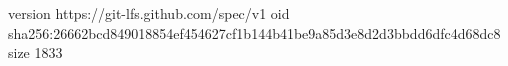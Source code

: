 version https://git-lfs.github.com/spec/v1
oid sha256:26662bcd849018854ef454627cf1b144b41be9a85d3e8d2d3bbdd6dfc4d68dc8
size 1833
